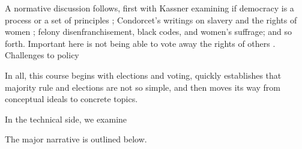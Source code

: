 A normative discussion follows, first with Kassner examining if democracy is a process or a set of principles \autocite{Kassner2006}; Condorcet's writings on slavery and the rights of women \autocite{Condorcet1781,Condorcet178}; felony disenfranchisement, black codes, and women's suffrage; and so forth.  Important here is not being able to vote away the rights of others \autocite{Kassner2006,Rawls1997}.  Challenges to policy



In all, this course begins with elections and voting, quickly establishes that majority rule and elections are not so simple, and then moves its way from conceptual ideals to concrete topics.

In the technical side, we examine

The major narrative is outlined below.

